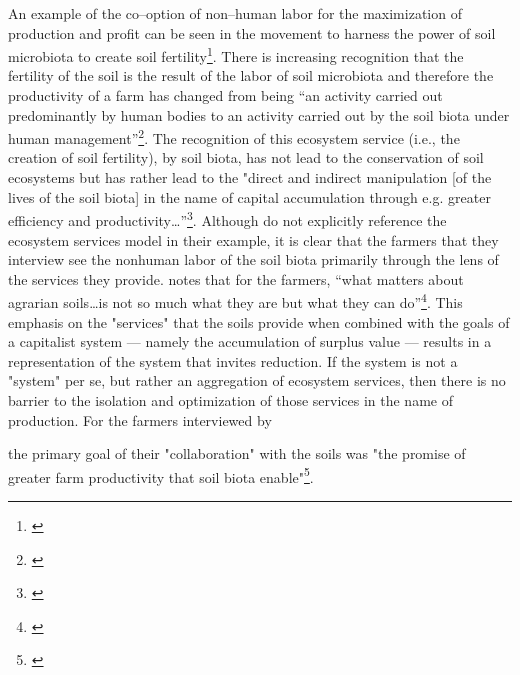 \documentclass{article}
\begin{document}
An example of the co--option of non--human labor for the maximization of production and profit can be seen in the movement to harness the power of soil microbiota to create soil fertility\footnote{\cite{krz_nonhuman_2020}}. There is increasing recognition that the fertility of the soil is the result of the labor of soil microbiota and therefore the productivity of a farm has changed from being ``an activity carried out predominantly by human bodies to an activity carried out by the soil biota under human management''\footnote{\cite[p. ?]{krz_nonhuman_2020}}. The recognition of this ecosystem service (i.e., the creation of soil fertility), by soil biota, has not lead to the conservation of soil ecosystems but has rather lead to the "direct and indirect manipulation [of the lives of the soil biota] in the name of capital accumulation through e.g. greater efficiency and productivity\ldots''\footnote{\cite[p. 239]{krz_nonhuman_2020}}. Although \citeauthor{krz_nonhuman_2020} do not explicitly reference the ecosystem services model in their example, it is clear that the farmers that they interview see the nonhuman labor of the soil biota primarily through the lens of the services they provide. \citeauthor{krz_nonhuman_2020} notes that for the farmers, ``what matters about agrarian soils\ldots is not so much what they are but what they can do''\footnote{\cite[p. 234]{krz_nonhuman_2020}}. This emphasis on the "services" that the soils provide when combined with the goals of a capitalist system --- namely the accumulation of surplus value --- results in a representation of the system that invites reduction. If the system is not a "system" per se, but rather an aggregation of ecosystem services, then there is no barrier to the isolation and optimization of those services in the name of production. For the farmers interviewed by {\cite{krz_nonhuman_2020} the primary goal of their "collaboration" with the soils was "the promise of greater farm productivity that soil biota enable"\footnote{\cite[p. 243]{krz_nonhuman_2020}}.

}
\end{document}
